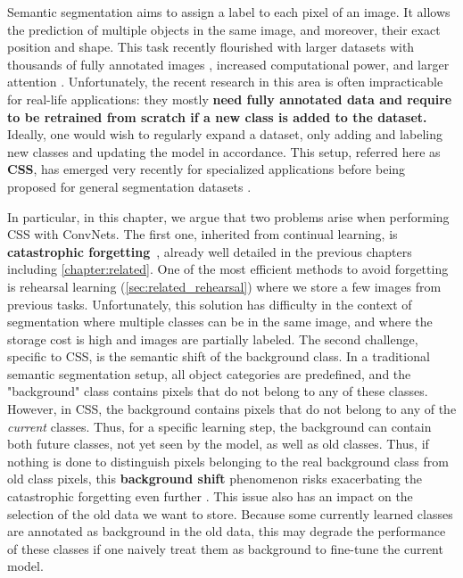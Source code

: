 Semantic segmentation aims to assign a label to each pixel of an image. It allows the prediction of
multiple objects in the same image, and moreover, their exact position and shape. This task recently
flourished \citep{tao2020HRNet,zhang2020resnest,chen2018ZPSA} with larger datasets with thousands of
fully annotated images \citep{zhou2017adedataset,neuhold2017mapillary}, increased computational
power, and larger attention \citep{wang2020axialdeeplab}. Unfortunately, the recent research in this
area is often impracticable for real-life applications: they mostly \textbf{need fully annotated
    data and require to be retrained from scratch if a new class is added to the dataset.} Ideally, one
would wish to regularly expand a dataset, only adding and labeling new classes and updating the
model in accordance. This setup, referred here as \textbf{\acf{CSS}}, has emerged very recently for
specialized applications
\citep{ozdemir2018learnthenewkeeptheold,ozdemir2019segmentationanotomical,tasar19incrementsegmentationremotesensing}
before being proposed for general segmentation datasets
\citep{michieli2019ilt,cermelli2020modelingthebackground}.


In particular, in this chapter, we argue that two problems arise when performing \ac{CSS} with
\acp{ConvNet}. The first one, inherited from continual learning, is \textbf{catastrophic
    forgetting}~\citep{robins1995catastrophicforgetting}, already well detailed in the previous chapters
including \autoref{chapter:related}. One of the most efficient methods to avoid forgetting is
rehearsal learning (\autoref{sec:related_rehearsal}) where we store a few images from previous
tasks. Unfortunately, this solution has difficulty in the context of segmentation where multiple
classes can be in the same image, and where the storage cost is high and images are partially
labeled. The second challenge, specific to \ac{CSS}, is the semantic shift of the background class.
In a traditional semantic segmentation setup, all object categories are predefined, and the
"background" class contains pixels that do not belong to any of these classes. However, in \ac{CSS},
the background contains pixels that do not belong to any of the \textit{current} classes. Thus, for
a specific learning step, the background can contain both future classes, not yet seen by the model,
as well as old classes. Thus, if nothing is done to distinguish pixels belonging to the real
background class from old class pixels, this \textbf{background shift} phenomenon risks exacerbating
the catastrophic forgetting even further \citep{cermelli2020modelingthebackground}. This issue also
has an impact on the selection of the old data we want to store. Because some currently learned
classes are annotated as background in the old data, this may degrade the performance of these
classes if one naively treat them as background to fine-tune the current model.

